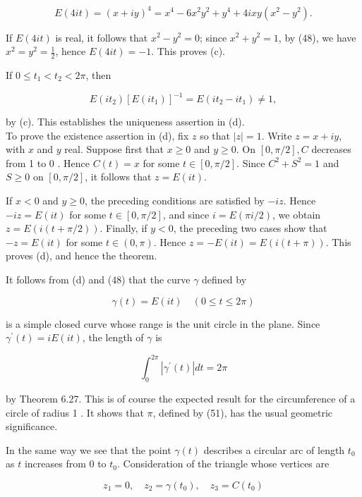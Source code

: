 \documentclass[10pt]{article}
\begin{document}
$$
E(4 i t)=(x+i y)^{4}=x^{4}-6 x^{2} y^{2}+y^{4}+4 i x y\left(x^{2}-y^{2}\right) .
$$

If $E(4 i t)$ is real, it follows that $x^{2}-y^{2}=0$; since $x^{2}+y^{2}=1$, by (48), we have $x^{2}=y^{2}=\frac{1}{2}$, hence $E(4 i t)=-1$. This proves (c).

If $0 \leq t_{1}<t_{2}<2 \pi$, then

$$
E\left(i t_{2}\right)\left[E\left(i t_{1}\right)\right]^{-1}=E\left(i t_{2}-i t_{1}\right) \neq 1,
$$

by (c). This establishes the uniqueness assertion in (d).\\
To prove the existence assertion in (d), fix $z$ so that $|z|=1$. Write $z=x+i y$, with $x$ and $y$ real. Suppose first that $x \geq 0$ and $y \geq 0$. On $[0, \pi / 2], C$ decreases from 1 to 0 . Hence $C(t)=x$ for some $t \in[0, \pi / 2]$. Since $C^{2}+S^{2}=1$ and $S \geq 0$ on $[0, \pi / 2]$, it follows that $z=E(i t)$.

If $x<0$ and $y \geq 0$, the preceding conditions are satisfied by $-i z$. Hence $-i z=E(i t)$ for some $t \in[0, \pi / 2]$, and since $i=E(\pi i / 2)$, we obtain $z=E(i(t+\pi / 2))$. Finally, if $y<0$, the preceding two cases show that\\
$-z=E(i t)$ for some $t \in(0, \pi)$. Hence $z=-E(i t)=E(i(t+\pi))$. This proves (d), and hence the theorem.

It follows from (d) and (48) that the curve $\gamma$ defined by


\begin{equation*}
\gamma(t)=E(i t) \quad(0 \leq t \leq 2 \pi) \tag{54}
\end{equation*}


is a simple closed curve whose range is the unit circle in the plane. Since $\gamma^{\prime}(t)=i E(i t)$, the length of $\gamma$ is

$$
\int_{0}^{2 \pi}\left|\gamma^{\prime}(t)\right| d t=2 \pi
$$

by Theorem 6.27. This is of course the expected result for the circumference of a circle of radius 1 . It shows that $\pi$, defined by (51), has the usual geometric significance.

In the same way we see that the point $\gamma(t)$ describes a circular arc of length $t_{0}$ as $t$ increases from 0 to $t_{0}$. Consideration of the triangle whose vertices are

$$
z_{1}=0, \quad z_{2}=\gamma\left(t_{0}\right), \quad z_{3}=C\left(t_{0}\right)
$$
\end{document}
